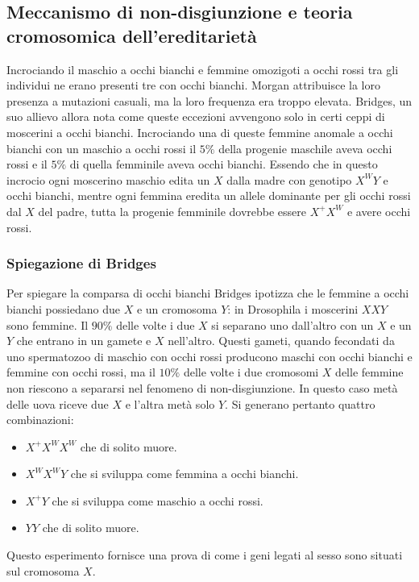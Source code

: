 	\subsection{Meccanismo di non-disgiunzione e teoria cromosomica dell'ereditariet\`a}
	Incrociando il maschio a occhi bianchi e femmine omozigoti a occhi rossi tra gli individui ne erano presenti tre con occhi bianchi.
	Morgan attribuisce la loro presenza a mutazioni casuali, ma la loro frequenza era troppo elevata.
	Bridges, un suo allievo allora nota come queste eccezioni avvengono solo in certi ceppi di moscerini a occhi bianchi.
	Incrociando una di queste femmine anomale a occhi bianchi con un maschio a occhi rossi il $5\%$ della progenie maschile aveva occhi rossi e il $5\%$ di quella femminile aveva occhi bianchi.
	Essendo che in questo incrocio ogni moscerino maschio edita un $X$ dalla madre con genotipo $X^WY$ e occhi bianchi, mentre ogni femmina eredita un allele dominante per gli occhi rossi dal $X$ del padre, tutta la progenie femminile dovrebbe essere $X^+X^W$ e avere occhi rossi.

		\subsubsection{Spiegazione di Bridges}
		Per spiegare la comparsa di occhi bianchi Bridges ipotizza che le femmine a occhi bianchi possiedano due $X$ e un cromosoma $Y$: in Drosophila i moscerini $XXY$ sono femmine.
		Il $90\%$ delle volte i due $X$ si separano uno dall'altro con un $X$ e un $Y$ che entrano in un gamete e $X$ nell'altro.
		Questi gameti, quando fecondati da uno spermatozoo di maschio con occhi rossi producono maschi con occhi bianchi e femmine con occhi rossi, ma il $10\%$ delle volte i due cromosomi $X$ delle femmine non riescono a separarsi nel fenomeno di non-disgiunzione.
		In questo caso met\`a delle uova riceve due $X$ e l'altra met\`a solo $Y$.
		Si generano pertanto quattro combinazioni:
		\begin{multicols}{2}
			\begin{itemize}
				\item $X^+X^WX^W$ che di solito muore.
				\item $X^WX^WY$ che si sviluppa come femmina a occhi bianchi.
				\item $X^+Y$ che si sviluppa come maschio a occhi rossi.
				\item $YY$ che di solito muore.
			\end{itemize}
		\end{multicols}
		Questo esperimento fornisce una prova di come i geni legati al sesso sono situati sul cromosoma $X$.

